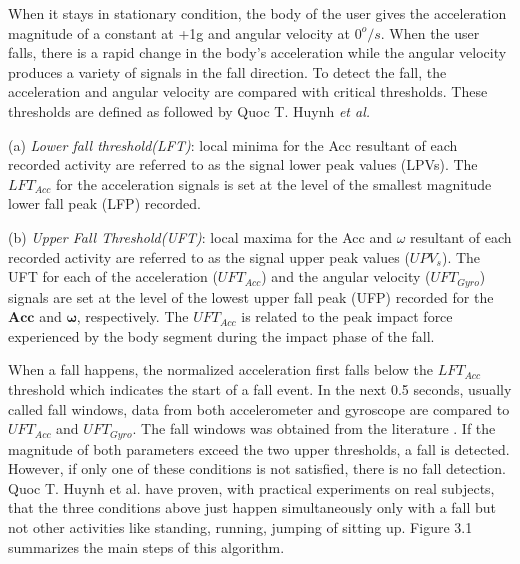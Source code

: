 \documentclass[letterpaper,12pt,titlepage,oneside,final]{book}
\let\origdoublepage\cleardoublepage
\newcommand{\clearemptydoublepage}{%
	\clearpage{\pagestyle{empty}\origdoublepage}}
\let\cleardoublepage\clearemptydoublepage
\begin{document}
When it stays in stationary condition, the body of the user gives the acceleration magnitude of a constant at +1g and angular velocity at $0^{o}/s$. When the user falls, there is a rapid change in the body's acceleration while the angular velocity produces a variety of signals in the fall direction. To detect the fall, the acceleration and angular velocity are compared with critical thresholds. These thresholds are defined as followed by Quoc T. Huynh \textit{et al.} \par 
{\addtolength{\leftskip}{1.5cm}
(a) \textit{Lower fall threshold(LFT)}: local minima for the Acc
resultant of each recorded activity are referred to
as the signal lower peak values (LPVs). The $LFT_{Acc}$
for the acceleration signals is set at the level of the
smallest magnitude lower fall peak (LFP) recorded.\par
}
{\addtolength{\leftskip}{1.5cm}
	(b) \textit{Upper Fall Threshold(UFT)}: local maxima for the Acc and $\omega$
	resultant of each recorded activity are referred to as
	the signal upper peak values ($UPV_{s}$). The UFT for
	each of the acceleration ($UFT_{Acc}$) and the angular
	velocity ($UFT_{Gyro}$) signals are set at the level of the
	lowest upper fall peak (UFP) recorded for the $\boldsymbol{Acc}$
	and $\boldsymbol{\omega}$, respectively. The $UFT_{Acc}$ is related to the peak
	impact force experienced by the body segment during
	the impact phase of the fall.\par
}
\cleardoublepage
When a fall happens, the normalized acceleration first falls below the $LFT_{Acc}$ threshold
which indicates the start of a fall event. In the next 0.5 seconds, usually called fall windows,
data from both accelerometer and gyroscope are compared to $UFT_{Acc}$ and $UFT_{Gyro}$. The fall windows was obtained from the literature \cite{window_1}\cite{window_2}. If
the magnitude of both parameters exceed the two upper thresholds, a fall is detected.
However, if only one of these conditions is not satisfied, there is no fall detection. Quoc T.
Huynh et al. \cite{main_quoc} have proven, with practical experiments on real subjects, that the three
conditions above just happen simultaneously only with a fall but not other activities like
standing, running, jumping of sitting up. Figure 3.1 summarizes the main steps of this
algorithm.
\cleardoublepage
\end{document}
